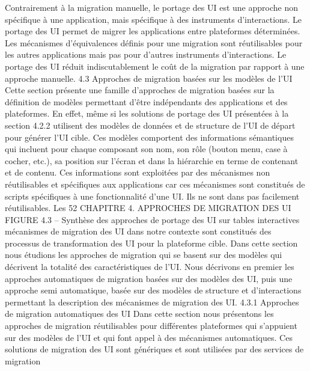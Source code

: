 \documentclass{article}
\begin{document}
Contrairement \`{a} la migration manuelle, le portage des UI est une approche non sp\'{e}ciﬁque \`{a} une
application, mais sp\'{e}ciﬁque \`{a} des instruments d’interactions. Le portage des UI permet de migrer les
applications entre plateformes d\'{e}termin\'{e}es. Les m\'{e}canismes d’\'{e}quivalences d\'{e}ﬁnis pour une migration sont r\'{e}utilisables pour les autres applications mais pas pour d’autres instruments d’interactions.
Le portage des UI r\'{e}duit indiscutablement le co\^{u}t de la migration par rapport \`{a} une approche manuelle.
4.3
Approches de migration bas\'{e}es sur les mod\`{e}les de l’UI
Cette section pr\'{e}sente une famille d’approches de migration bas\'{e}es sur la d\'{e}ﬁnition de mod\`{e}les
permettant d’\^{e}tre ind\'{e}pendants des applications et des plateformes. En effet, m\^{e}me si les solutions de
portage des UI pr\'{e}sent\'{e}es \`{a} la section 4.2.2 utilisent des mod\`{e}les de donn\'{e}es et de structure de l’UI
de d\'{e}part pour g\'{e}n\'{e}rer l’UI cible. Ces mod\`{e}les comportent des informations s\'{e}mantiques qui incluent
pour chaque composant son nom, son r\^{o}le (bouton menu, case \`{a} cocher, etc.), sa position sur l’\'{e}cran
et dans la hi\'{e}rarchie en terme de contenant et de contenu. Ces informations sont exploit\'{e}es par des
m\'{e}canismes non r\'{e}utilisables et sp\'{e}ciﬁques aux applications car ces m\'{e}canismes sont constitu\'{e}s de
scripts sp\'{e}ciﬁques \`{a} une fonctionnalit\'{e} d’une UI. Ils ne sont dans pas facilement r\'{e}utilisables. Les
52
CHAPITRE 4. APPROCHES DE MIGRATION DES UI
FIGURE 4.3 – Synth\`{e}se des approches de portage des UI sur tables interactives
m\'{e}canismes de migration des UI dans notre contexte sont constitu\'{e}s des processus de transformation
des UI pour la plateforme cible.
Dans cette section nous \'{e}tudions les approches de migration qui se basent sur des mod\`{e}les qui
d\'{e}crivent la totalit\'{e} des caract\'{e}ristiques de l’UI. Nous d\'{e}crivons en premier les approches automatiques de migration bas\'{e}es sur des mod\`{e}les des UI, puis une approche semi automatique, bas\'{e}e sur
des mod\`{e}les de structure et d’interactions permettant la description des m\'{e}canismes de migration des
UI.
4.3.1
Approches de migration automatiques des UI
Dans cette section nous pr\'{e}sentons les approches de migration r\'{e}utilisables pour diff\'{e}rentes plateformes qui s’appuient sur des mod\`{e}les de l’UI et qui font appel \`{a} des m\'{e}canismes automatiques.
Ces solutions de migration des UI sont g\'{e}n\'{e}riques et sont utilis\'{e}es par des services de migration
\end{document}
